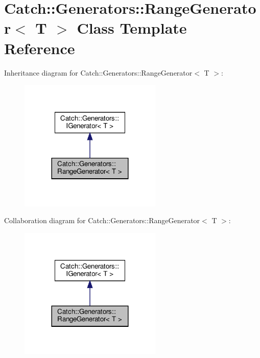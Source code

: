 \hypertarget{classCatch_1_1Generators_1_1RangeGenerator}{}\section{Catch\+::Generators\+::Range\+Generator$<$ T $>$ Class Template Reference}
\label{classCatch_1_1Generators_1_1RangeGenerator}


Inheritance diagram for Catch\+::Generators\+::Range\+Generator$<$ T $>$\+:\nopagebreak
\begin{figure}[H]
\begin{center}
\leavevmode
\includegraphics[width=192pt]{classCatch_1_1Generators_1_1RangeGenerator__inherit__graph}
\end{center}
\end{figure}


Collaboration diagram for Catch\+::Generators\+::Range\+Generator$<$ T $>$\+:\nopagebreak
\begin{figure}[H]
\begin{center}
\leavevmode
\includegraphics[width=192pt]{classCatch_1_1Generators_1_1RangeGenerator__coll__graph}
\end{center}
\end{figure}
